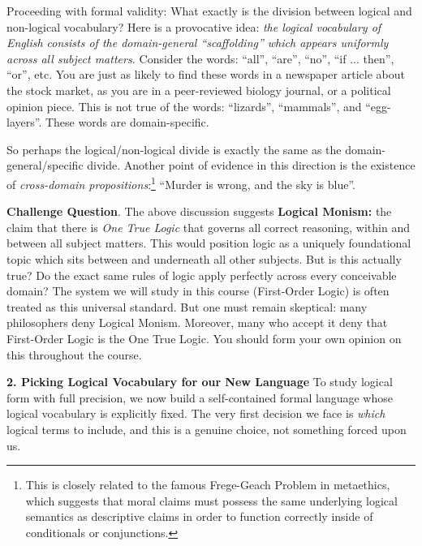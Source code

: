 \documentclass[options]{philosophersimprint}
\theoremstyle{definition}
\begin{document}
Proceeding with formal validity: What exactly is the division between logical and non-logical vocabulary? Here is a provocative idea: \textit{the logical vocabulary of English consists of the domain-general ``scaffolding'' which appears uniformly across all subject matters.} Consider the words: ``all'', ``are'', ``no'', ``if ... then'', ``or'', etc. You are just as likely to find these words in a newspaper article about the stock market, as you are in a peer-reviewed biology journal, or a political opinion piece. This is not true of the words: ``lizards'', ``mammals'', and ``egg-layers''. These words are domain-specific.

So perhaps the logical/non-logical divide is exactly the same as the domain-general/specific divide. Another point of evidence in this direction is the existence of \textit{cross-domain propositions}:\footnote{This is closely related to the famous Frege-Geach Problem in metaethics, which suggests that moral claims must possess the same underlying logical semantics as descriptive claims in order to function correctly inside of conditionals or conjunctions.} ``Murder is wrong, and the sky is blue''.

\textbf{Challenge Question}. The above discussion suggests \textbf{Logical Monism:} the claim that there is \textit{One True Logic} that governs all correct reasoning, within and between all subject matters. This would position logic as a uniquely foundational topic which sits between and underneath all other subjects. But is this actually true? Do the exact same rules of logic apply perfectly across every conceivable domain? The system we will study in this course (First-Order Logic) is often treated as this universal standard. But one must remain skeptical: many philosophers deny Logical Monism. Moreover, many who accept it deny that First-Order Logic is the One True Logic. You should form your own opinion on this throughout the course.

\textbf{2. Picking Logical Vocabulary for our New Language} To study logical form with full precision, we now build a self-contained formal language whose logical vocabulary is explicitly fixed. The very first decision we face is \textit{which} logical terms to include, and this is a genuine choice, not something forced upon us.
\end{document}
